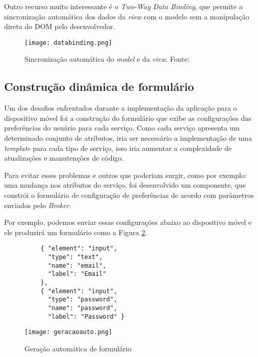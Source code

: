 Outro recurso muito interessante é o \textit{Two-Way Data Binding}, que permite a sincronização automática dos dados da \textit{view} com o modelo sem a manipulação direta do DOM pelo desenvolvedor.

\begin{figure}[!htb]
  \centering
  \texttt{[image: databinding.png]} %
  \caption[Sincronização automática do \textit{model} e da \textit{view}]{Sincronização automática do \textit{model} e da \textit{view}. Fonte: \cite{angulardb}}
  \label{fig:twoway}
\end{figure}

\subsection{Construção dinâmica de formulário}
Um dos desafios enfrentados durante a implementação da aplicação para o dispositivo móvel foi a construção do formulário que exibe as configurações das preferências do usuário para cada serviço. Como cada serviço apresenta um determinado conjunto de atributos, iria ser necessário a implementação de uma \textit{template} para cada tipo de serviço, isso iria aumentar a complexidade de atualizações e manutenções de código.

Para evitar esses problemas e outros que poderiam surgir, como por exemplo: uma mudança nos atributos do serviço, foi desenvolvido um componente, que constrói o formulário de configuração de preferências de acordo com parâmetros enviados pelo \textit{Broker}.

Por exemplo, podemos enviar essas configurações abaixo ao dispositivo móvel e ele produzirá um formulário como a Figura \ref{fig:geracaoauto}.
\begin{footnotesize}
  \begin{verbatim}
          { "element": "input",
            "type": "text",
            "name": "email",
            "label": "Email"
          },
          { "element": "input",
            "type": "password",
            "name": "password",
            "label": "Password" }
  \end{verbatim}
\end{footnotesize}

\begin{figure}[!htb]
  \centering
  \texttt{[image: geracaoauto.png]} %
  \caption[Geração automática de formulário]{Geração automática de formulário}
  \label{fig:geracaoauto}
\end{figure}


